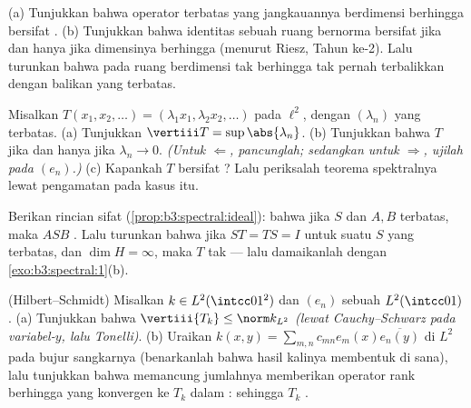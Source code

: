 \begin{exercise}[$\star$]\label{exo:b3:spectral:1}
(a) Tunjukkan bahwa operator terbatas yang jangkauannya berdimensi berhingga
bersifat .
(b) Tunjukkan bahwa identitas sebuah ruang bernorma bersifat  jika dan hanya jika
dimensinya berhingga (menurut Riesz, Tahun ke-2). Lalu turunkan bahwa  pada ruang berdimensi tak berhingga tak pernah terbalikkan
dengan balikan yang terbatas.
\end{exercise}

\begin{exercise}[$\star$]\label{exo:b3:spectral:2}
Misalkan $T(x_1, x_2, \dots) = (\lambda_1x_1, \lambda_2x_2, \dots)$
pada $\ell^2$, dengan $(\lambda_n)$ yang terbatas.
(a) Tunjukkan $\vertiii T = \sup\abs{\lambda_n}$.
(b) Tunjukkan bahwa $T$  jika dan hanya jika $\lambda_n \to 0$.
\emph{(Untuk $\Leftarrow$, pancunglah; sedangkan untuk $\Rightarrow$, ujilah pada
$(e_n)$.)}
(c) Kapankah $T$ bersifat ? Lalu periksalah teorema spektralnya lewat
pengamatan pada kasus itu.
\end{exercise}

\begin{exercise}[$\star\star$]\label{exo:b3:spectral:3}
Berikan rincian sifat 
(\cref{prop:b3:spectral:ideal}): bahwa jika $S$  dan $A, B$
terbatas, maka $ASB$ . Lalu turunkan bahwa jika $ST = TS = I$
untuk suatu $S$ yang terbatas, dan $\dim H = \infty$, maka $T$ tak
 --- lalu damaikanlah dengan \cref{exo:b3:spectral:1}(b).
\end{exercise}

\begin{exercise}[$\star\star$]\label{exo:b3:spectral:4}
(Hilbert--Schmidt) Misalkan $k \in L^2(\intcc01^2)$ dan $(e_n)$ sebuah
 $L^2(\intcc01)$.
(a) Tunjukkan bahwa $\vertiii{T_k} \leq \norm k_{L^2}$
\emph{(lewat Cauchy--Schwarz pada variabel-$y$, lalu Tonelli)}.
(b) Uraikan $k(x,y) = \sum_{m,n}c_{mn}e_m(x)\overline{e_n(y)}$
di $L^2$ pada bujur sangkarnya (benarkanlah bahwa hasil kalinya membentuk
 di sana), lalu tunjukkan bahwa memancung jumlahnya memberikan
operator rank berhingga yang konvergen ke $T_k$ dalam :
sehingga $T_k$ .
\end{exercise}

